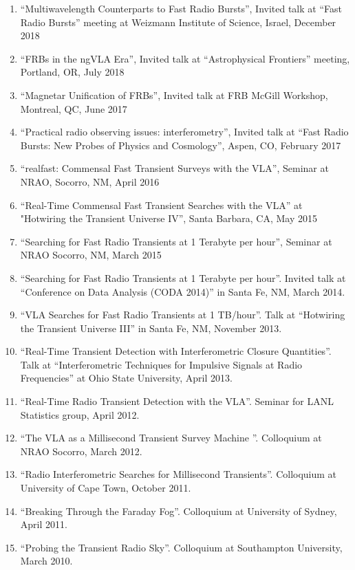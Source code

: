 \documentclass[11pt]{article}
\begin{document}
\begin{enumerate}

    \item ``Multiwavelength Counterparts to Fast Radio Bursts'', Invited talk at ``Fast Radio Bursts'' meeting at Weizmann Institute of Science, Israel, December 2018

    \item ``FRBs in the ngVLA Era'', Invited talk at ``Astrophysical Frontiers'' meeting, Portland, OR, July 2018

    \item ``Magnetar Unification of FRBs'', Invited talk at FRB McGill Workshop, Montreal, QC, June 2017

    \item ``Practical radio observing issues: interferometry'', Invited talk at ``Fast Radio Bursts: New Probes of Physics and Cosmology'', Aspen, CO, February 2017

    \item ``realfast: Commensal Fast Transient Surveys with the VLA'', Seminar at NRAO, Socorro, NM, April 2016

    \item ``Real-Time Commensal Fast Transient Searches with the VLA'' at "Hotwiring the Transient Universe IV'', Santa Barbara, CA, May 2015

    \item ``Searching for Fast Radio Transients at 1 Terabyte per hour'', Seminar at NRAO Socorro, NM, March 2015

    \item ``Searching for Fast Radio Transients at 1 Terabyte per hour''. Invited talk at ``Conference on Data Analysis (CODA 2014)'' in Santa Fe, NM, March 2014.

    \item ``VLA Searches for Fast Radio Transients at 1 TB/hour''. Talk at ``Hotwiring the Transient Universe III'' in Santa Fe, NM, November 2013.

    \item ``Real-Time Transient Detection with Interferometric Closure Quantities''. Talk at ``Interferometric Techniques for Impulsive Signals at Radio Frequencies'' at Ohio State University, April 2013.

    \item ``Real-Time Radio Transient Detection with the VLA''. Seminar for LANL Statistics group, April 2012.

    \item ``The VLA as a Millisecond Transient Survey Machine ''. Colloquium at NRAO Socorro, March 2012.

    \item ``Radio Interferometric Searches for Millisecond Transients''. Colloquium at University of Cape Town, October 2011.

    \item ``Breaking Through the Faraday Fog''. Colloquium at University of Sydney, April 2011.

    \item ``Probing the Transient Radio Sky''. Colloquium at Southampton University, March 2010.
\end{enumerate}
\end{document}

